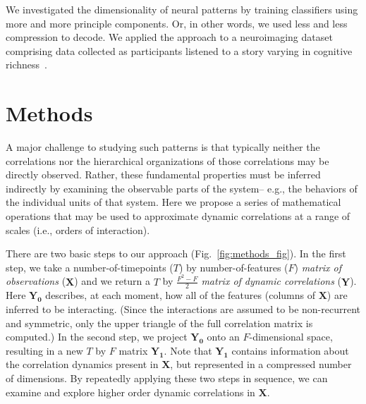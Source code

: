 \documentclass[english]{article}
\begin{document}
We investigated the dimensionality of neural patterns by training
classifiers using more and more principle components. Or, in other
words, we used less and less compression to decode.
We applied the approach to
a neuroimaging dataset comprising data collected as participants
listened to a story varying in cognitive richness~\citep{SimoEtal16}.





\section*{Methods}
A major challenge to studying such patterns is that typically neither
the correlations nor the hierarchical organizations of those
correlations may be directly observed.  Rather, these fundamental
properties must be inferred indirectly by examining the observable
parts of the system-- e.g., the behaviors of the individual units of
that system.  Here we propose a series of mathematical operations that may be used to approximate dynamic correlations at a range of scales (i.e., orders of interaction).

There are two basic steps to our approach (Fig.~\ref{fig:methods_fig}).  In the first step, we take
a number-of-timepoints ($T$) by number-of-features ($F$)
\textit{matrix of observations} ($\mathbf{X}$) and we return a $T$ by
$\frac{F^2 - F}{2}$ \textit{matrix of dynamic correlations}
($\mathbf{Y}$).  Here $\mathbf{Y_0}$ describes, at each moment, how
all of the features (columns of $\mathbf{X}$) are inferred to be
interacting.  (Since the interactions are assumed to be non-recurrent
and symmetric, only the upper triangle of the full correlation matrix
is computed.)  In the second step, we project $\mathbf{Y_0}$ onto an
$F$-dimensional space, resulting in a new $T$ by $F$ matrix
$\mathbf{Y_1}$.  Note that $\mathbf{Y_1}$ contains information about
the correlation dynamics present in $\mathbf{X}$, but represented in a
compressed number of dimensions.  By repeatedly applying these two
steps in sequence, we can examine and explore higher order dynamic
correlations in $\mathbf{X}$.
\end{document}
